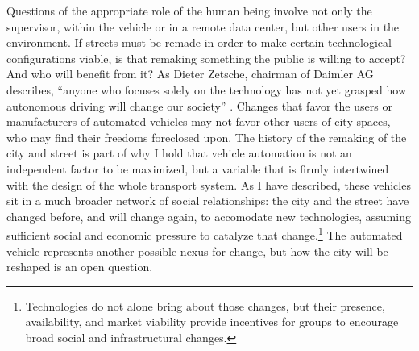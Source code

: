 
Questions of the appropriate role of the human being involve not
only the supervisor, within the vehicle or in a remote data center,
but other users in the environment. If streets must be remade in
order to make certain technological configurations viable, is that
remaking something the public is willing to accept? And who will
benefit from it? As Dieter Zetsche, chairman of Daimler AG describes,
``anyone who focuses solely on the technology has not yet grasped how 
autonomous driving will change our
society'' \cite{slashgearDavies}. Changes that favor the users or
manufacturers of automated vehicles may not favor other users of city
spaces, who may find their freedoms foreclosed upon. The history of
the remaking of the city and street is part of why I hold that
vehicle automation is not an 
independent factor to be maximized, but a variable that is firmly
intertwined with the design of the whole transport system.
As I have described, these vehicles sit in a much broader network of
social relationships: the city and the street have changed before, and
will change again, to accomodate new technologies, assuming sufficient
social and economic pressure to catalyze that change.\footnote{Technologies do
not alone bring about those changes, but their presence, availability,
and market viability provide incentives for groups to encourage broad
social and infrastructural changes.} The automated vehicle represents
another possible nexus for change, but how the city will be reshaped
is an open question. 


